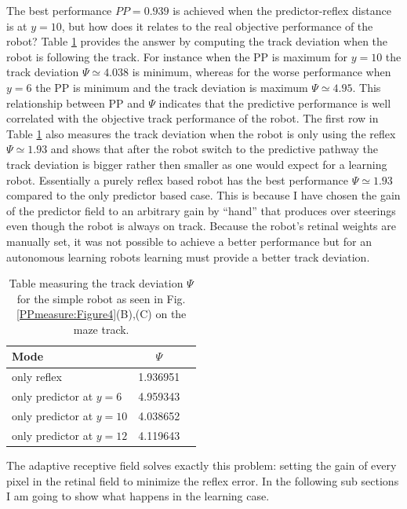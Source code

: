 The best performance $PP=0.939$ is achieved when the predictor-reflex distance is 
at $y=10$, but how does it relates to the real objective performance of the robot?
Table \ref{table:PPmeausure:TableSimpleTrack} provides the answer by computing the
track deviation when the robot is following the track.
For instance when the PP is maximum for $y=10$ the track deviation $\Psi\simeq4.038$
is minimum, whereas for the worse performance when $y=6$ the PP is minimum and 
the track deviation is maximum $\Psi\simeq4.95$.
This relationship between PP and $\Psi$ indicates that the predictive performance
is well correlated with the objective track performance of the robot.
The first row in Table \ref{table:PPmeausure:TableSimpleTrack} also measures
the track deviation when the robot is only using the reflex $\Psi\simeq 1.93$ and 
shows that after the robot switch to the predictive pathway the track deviation 
is bigger rather then smaller as one would expect for a learning robot.
Essentially a purely reflex 
based robot has the best performance $\Psi \simeq 1.93$ compared to the only predictor based case. 
This is because I have chosen the gain of the predictor field to an arbitrary gain
by ``hand'' that produces over steerings even though the robot is always on track.
Because the robot's retinal weights are manually set, it was not possible to 
achieve a better performance but for an autonomous learning robots 
learning must provide a better track deviation.

\begin{table}[htbp]
\caption[Track deviation values for simple robot]{Table measuring the track deviation $\Psi$ for the simple robot 
as seen in Fig.\ref{PPmeasure:Figure4}(B),(C) on the maze track. \label{table:PPmeausure:TableSimpleTrack}}
\begin{center}
  \begin{tabular}{| l | c | c |}
    \hline
     Mode & $\Psi$ \\ \hline
     only reflex & 1.936951 \\ \hline
     only predictor at $y=6$  & 4.959343\\ \hline
     only predictor at $y=10$ & 4.038652\\ \hline
     only predictor at $y=12$ & 4.119643\\ \hline
  \end{tabular}
\end{center}
\end{table}

The adaptive receptive field solves exactly this problem: setting the gain of every
pixel in the retinal field to minimize the reflex error.
In the following sub sections I am going to show what happens in the learning case.

